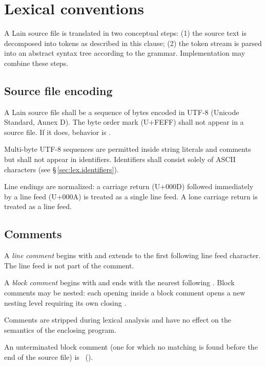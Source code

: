 \chapter{Lexical conventions}
\label{sec:05-lexical}

\pnum
A Lain source file is translated in two conceptual steps: (1) the source
text is decomposed into tokens as described in this clause; (2) the token
stream is parsed into an abstract syntax tree according to the grammar.
Implementation may combine these steps.

\section{Source file encoding}
\label{sec:lex.encoding}

\pnum
A Lain source file shall be a sequence of bytes encoded in UTF-8 (Unicode
Standard, Annex D).  The byte order mark (U+FEFF) shall not appear in a
source file.  If it does, behavior is .

\pnum
Multi-byte UTF-8 sequences are permitted inside string literals and comments
but shall not appear in identifiers.  Identifiers shall consist solely of
ASCII characters (see \S\,\ref{sec:lex.identifiers}).

\pnum
Line endings are normalized: a carriage return (U+000D) followed
immediately by a line feed (U+000A) is treated as a single line feed.
A lone carriage return is treated as a line feed.

\section{Comments}
\label{sec:lex.comments}

\pnum
A \textit{line comment} begins with \tok{//} and extends to the first
following line feed character.  The line feed is not part of the comment.

\pnum
A \textit{block comment} begins with \tok{/*} and ends with the nearest
following \tok{*/}.  Block comments may be nested: each opening \tok{/*}
inside a block comment opens a new nesting level requiring its own closing
\tok{*/}.

\pnum
Comments are stripped during lexical analysis and have no effect on the
semantics of the enclosing program.

\begin{constraint}
  An unterminated block comment (one for which no matching \tok{*/} is
  found before the end of the source file) is \illformed{}~().
\end{constraint}

